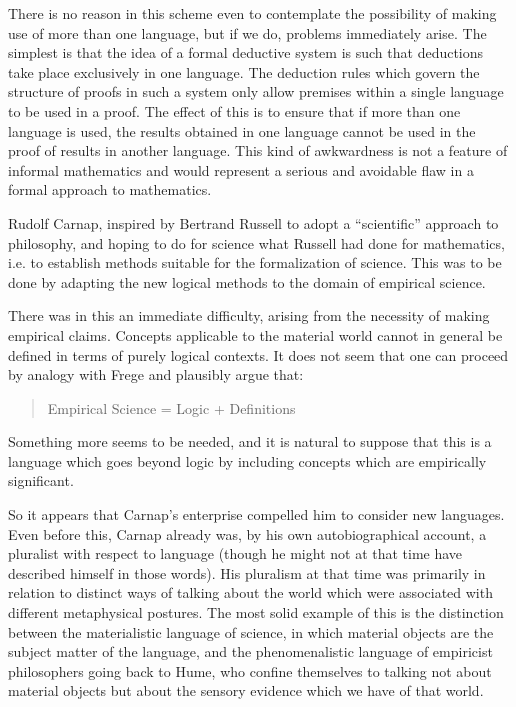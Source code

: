 There is no reason in this scheme even to contemplate the possibility
of making use of more than one language, but if we do, problems
immediately arise.
The simplest is that the idea of a formal deductive system is such
that deductions take place exclusively in one language.
The deduction rules which govern the structure of proofs in such a
system only allow premises within a single language to be used in a
proof.
The effect of this is to ensure that if more than one language is
used, the results obtained in one language cannot be used in the proof
of results in another language.
This kind of awkwardness is not a feature of informal mathematics and
would represent a serious and avoidable flaw in a formal approach to
mathematics. 

Rudolf Carnap, inspired by Bertrand Russell to adopt a ``scientific''
approach to philosophy, and hoping to do for science what Russell had
done for mathematics, i.e. to establish methods suitable for the
formalization of science.
This was to be done by adapting the new logical methods to the domain
of empirical science.

There was in this an immediate difficulty, arising from the necessity
of making empirical claims.
Concepts applicable to the material world cannot in general be defined
in terms of purely logical contexts.
It does not seem that one can proceed by analogy with Frege and
plausibly argue that:

\begin{quote}
Empirical Science = Logic + Definitions
\end{quote}

Something more seems to be needed, and it is natural to suppose that
this is a language which goes beyond logic by including concepts which
are empirically significant.

So it appears that Carnap's enterprise compelled him to consider
new languages.
Even before this, Carnap already was, by his own autobiographical
account, a pluralist with respect to language (though he might not at
that time have described himself in those words).
His pluralism at that time was primarily in relation to distinct ways
of talking about the world which were associated with different
metaphysical postures.
The most solid example of this is the distinction between the
materialistic language of science, in which material objects are the
subject matter of the language, and the phenomenalistic language of
empiricist philosophers going back to Hume, who confine themselves to
talking not about material objects but about the sensory evidence
which we have of that world.

